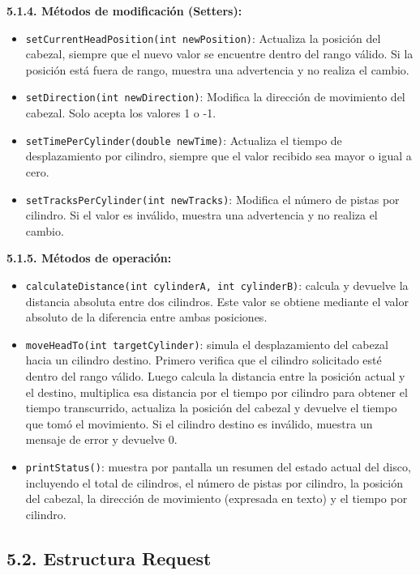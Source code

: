 \documentclass[14pt,letterpaper]{extarticle}
\begin{document}
\textbf{5.1.4. Métodos de modificación (Setters):}

\begin{itemize}
    \item \texttt{setCurrentHeadPosition(int newPosition)}: Actualiza la posición del cabezal, siempre que el nuevo valor se encuentre dentro del rango válido. Si la posición está fuera de rango, muestra una advertencia y no realiza el cambio.
    \item \texttt{setDirection(int newDirection)}: Modifica la dirección de movimiento del cabezal. Solo acepta los valores 1 o -1.
    \item \texttt{setTimePerCylinder(double newTime)}: Actualiza el tiempo de desplazamiento por cilindro, siempre que el valor recibido sea mayor o igual a cero.
    \item \texttt{setTracksPerCylinder(int newTracks)}: Modifica el número de pistas por cilindro. Si el valor es inválido, muestra una advertencia y no realiza el cambio.
\end{itemize}

\textbf{5.1.5. Métodos de operación:}

\begin{itemize}
    \item \texttt{calculateDistance(int cylinderA, int cylinderB)}: calcula y devuelve la distancia absoluta entre dos cilindros. Este valor se obtiene mediante el valor absoluto de la diferencia entre ambas posiciones.
    \item \texttt{moveHeadTo(int targetCylinder)}: simula el desplazamiento del cabezal hacia un cilindro destino. Primero verifica que el cilindro solicitado esté dentro del rango válido. Luego calcula la distancia entre la posición actual y el destino, multiplica esa distancia por el tiempo por cilindro para obtener el tiempo transcurrido, actualiza la posición del cabezal y devuelve el tiempo que tomó el movimiento. Si el cilindro destino es inválido, muestra un mensaje de error y devuelve 0.
    \item \texttt{printStatus()}: muestra por pantalla un resumen del estado actual del disco, incluyendo el total de cilindros, el número de pistas por cilindro, la posición del cabezal, la dirección de movimiento (expresada en texto) y el tiempo por cilindro.
\end{itemize}

\vfill

\subsection*{5.2. Estructura Request}
\end{document}
